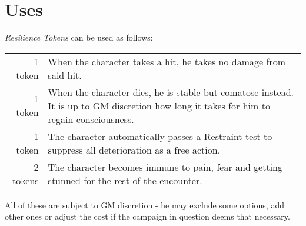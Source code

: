 \documentclass[12pt,a4paper,openany]{book}
\begin{document}
	\section{Uses}
	\emph{Resilience Tokens} can be used as follows:
	\par
	\begin{tabularx}{\columnwidth}{rX}
		1 token & When the character takes a hit, he takes no damage from said hit. \\
		1 token & When the character dies, he is stable but comatose instead. It is up to GM discretion how long it takes for him to regain consciousness. \\
		1 token & The character automatically passes a Restraint test to suppress all deterioration as a free action. \\
		2 tokens & The character becomes immune to pain, fear and getting stunned for the rest of the encounter.
	\end{tabularx}
	\par
	All of these are subject to GM discretion - he may exclude some options, add other ones or adjust the cost if the campaign in question deems that necessary.
\end{document}
